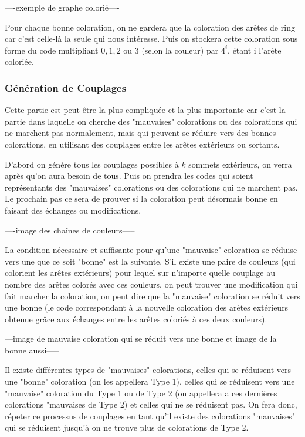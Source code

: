 \documentclass[10pt,a4paper]{article}
\begin{document}
----exemple de graphe colorié----

Pour chaque bonne coloration, on ne gardera que la coloration des arêtes de ring car c'est celle-là la seule qui nous intéresse. Puis on stockera cette coloration sous forme du code multipliant $0,1,2$ ou $3$ (selon la couleur) par $4^{i}$, étant i l'arête coloriée.
\subsubsection{Génération de Couplages}

Cette partie est peut être la plus compliquée et la plus importante car c'est la partie dans laquelle on cherche des "mauvaises" colorations ou des colorations qui ne marchent pas normalement, mais qui peuvent se réduire vers des bonnes colorations, en utilisant des couplages entre les arêtes extérieurs ou sortants. 

D'abord on génère tous les couplages possibles à $k$ sommets extérieurs, on verra après qu'on aura besoin de tous. Puis on prendra les codes qui soient représentants des "mauvaises" colorations ou des colorations qui ne marchent pas. Le prochain pas ce sera de prouver si la coloration peut désormais bonne en faisant des échanges ou modifications. 

----image des chaînes de couleurs-----

La condition nécessaire et suffisante pour qu'une "mauvaise" coloration se réduise vers une que ce soit "bonne" est la suivante. S'il existe une paire de couleurs (qui colorient les arêtes extérieurs) pour lequel sur n'importe quelle couplage au nombre des arêtes colorés avec ces couleurs, on peut trouver une modification qui fait marcher la coloration, on peut dire que la "mauvaise" coloration se réduit vers une bonne (le code correspondant à la nouvelle coloration des arêtes extérieurs obtenue grâce aux échanges entre les arêtes coloriés à ces deux couleurs).

---image de mauvaise coloration qui se réduit vers une bonne et image de la bonne aussi-----

Il existe différentes types de "mauvaises" colorations, celles qui se réduisent vers une "bonne" coloration (on les appellera Type 1), celles qui se réduisent vers une "mauvaise" coloration du Type 1 ou de Type 2 (on appellera a ces dernières colorations "mauvaises de Type 2) et celles qui ne se réduisent pas. On fera donc, répeter ce processus de couplages en tant qu'il existe des colorations "mauvaises" qui se réduisent jusqu'à on ne trouve plus de colorations de Type 2.
\end{document}
